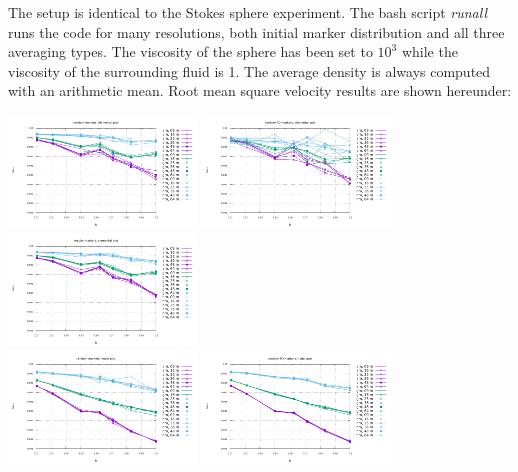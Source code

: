 The setup is identical to the Stokes sphere experiment. The bash script {\sl runall} runs the code for many resolutions, both initial marker distribution and all three averaging types. The viscosity of the sphere has been 
set to $10^3$ while the viscosity of the surrounding fluid is 1. 
The average density is always computed with an arithmetic mean. 
Root mean square velocity results are shown hereunder:

\begin{center}
\includegraphics[width=5cm]{python_codes/fieldstone_13/vrms_rand_proj1} 
\includegraphics[width=5cm]{python_codes/fieldstone_13/vrms_poissondisc_proj1} 
\includegraphics[width=5cm]{python_codes/fieldstone_13/vrms_reg_proj1}\\ 
\includegraphics[width=5cm]{python_codes/fieldstone_13/vrms_rand_proj2} 
\includegraphics[width=5cm]{python_codes/fieldstone_13/vrms_poissondisc_proj2} 

\end{center}
